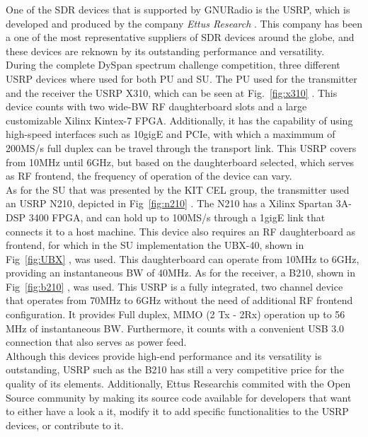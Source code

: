 One of the \ac{SDR} devices that is supported by GNURadio is the \ac{USRP}, which is developed and produced by the company \emph{Ettus Research\texttrademark} \cite{Ettus}. This company has been a one of the most representative suppliers of \ac{SDR} devices around the globe, and these devices are reknown by its outstanding performance and versatility.\\

During the complete \ac{DySpan} spectrum challenge competition, three different \ac{USRP} devices where used for both \ac{PU} and \ac{SU}. The \ac{PU} used for the transmitter and the receiver the \ac{USRP} X310, which can be seen at Fig.~\ref{fig:x310} \cite{X300}. This device counts with two wide-\ac{BW} \ac{RF} daughterboard slots and a large customizable Xilinx Kintex-7 FPGA. Additionally, it has the capability of using high-speed interfaces such as 10gigE and PCIe, with which a maximmum of 200MS/s full duplex can be travel through the transport link. This \ac{USRP} covers from 10MHz until 6GHz, but based on the daughterboard selected, which serves as \ac{RF} frontend, the frequency of operation of the device can vary.\\

As for the \ac{SU} that was presented by the \ac{KIT} \ac{CEL} group, the transmitter used an \ac{USRP} N210, depicted in Fig~\ref{fig:n210} \cite{N210}. The N210 has a Xilinx Spartan 3A-DSP 3400 FPGA, and can hold up to 100MS/s through a 1gigE link that connects it to a host machine.  This device also requires an \ac{RF} daughterboard as frontend, for which in the \ac{SU} implementation the UBX-40, shown in Fig~\ref{fig:UBX} \cite{UBX}, was used. This daughterboard can operate from 10MHz to 6GHz, providing an instantaneous \ac{BW} of 40MHz. As for the receiver, a B210, shown in Fig~\ref{fig:b210} \cite{B210}, was used. This \ac{USRP} is a fully integrated, two channel device that operates from 70MHz to 6GHz without the need of additional \ac{RF} frontend configuration. It provides Full duplex, MIMO (2 Tx - 2Rx) operation up to 56 MHz of instantaneous \ac{BW}. Furthermore, it counts with a convenient USB 3.0 connection that also serves as power feed.\\

Although this devices provide high-end performance and its versatility is outstanding, \ac{USRP} such as the B210 has still a very competitive price for the quality of its elements. Additionally, Ettus Research\texttrademark is commited with the Open Source community by making its source code available for developers that want to either have a look a it, modify it to add specific functionalities to the \ac{USRP} devices, or contribute to it.

